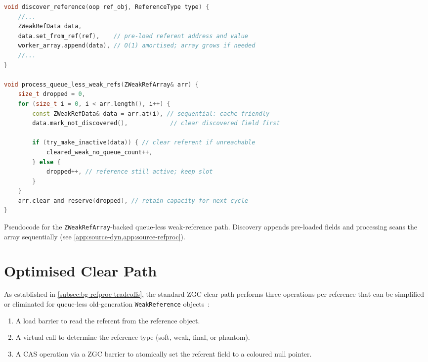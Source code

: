 \begin{listing}[t]
\begin{lstlisting}[language=C++]
void discover_reference(oop ref_obj, ReferenceType type) {
    //...
    ZWeakRefData data,
    data.set_from_ref(ref),    // pre-load referent address and value
    worker_array.append(data), // O(1) amortised; array grows if needed
    //...
}

void process_queue_less_weak_refs(ZWeakRefArray& arr) {
    size_t dropped = 0,
    for (size_t i = 0, i < arr.length(), i++) {
        const ZWeakRefData& data = arr.at(i), // sequential: cache-friendly
        data.mark_not_discovered(),            // clear discovered field first

        if (try_make_inactive(data)) { // clear referent if unreachable
            cleared_weak_no_queue_count++,
        } else {
            dropped++, // reference still active; keep slot
        }
    }
    arr.clear_and_reserve(dropped), // retain capacity for next cycle
}
\end{lstlisting}
\caption[Dynamic-array weak processing]{Pseudocode for the \texttt{ZWeakRefArray}-backed queue-less weak-reference path. Discovery appends pre-loaded fields and processing scans the array sequentially (see \cref{app:source-dyn,app:source-refproc}).}
\label{lst:dynamic-array-processing}
\end{listing}

\section{Optimised Clear Path}
\label{sec:di-clear}

As established in \cref{subsec:bg-refproc-tradeoffs}, the standard \ac{ZGC} clear path performs three operations per reference that can be simplified or eliminated for queue-less old-generation \texttt{WeakReference} objects~\cite{openjdk-zreferenceprocessor-cpp,openjdk-zbarrier-cpp}:
\begin{enumerate}
    \item A load barrier to read the referent from the reference object.
    \item A virtual call to determine the reference type (soft, weak, final, or phantom).
    \item A \ac{CAS} operation via a \ac{ZGC} barrier to atomically set the referent field to a coloured null pointer.
\end{enumerate}

